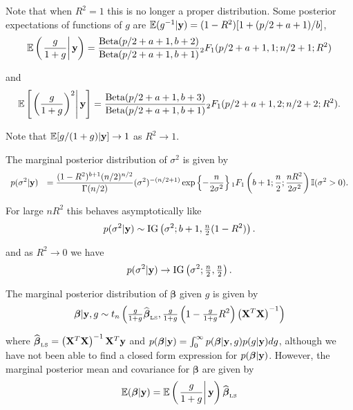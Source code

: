 \documentclass{article}
\def\vectorfontone{\bf}
\def\vectorfonttwo{\boldsymbol}
\def\vy{{\vectorfontone y}}                      %
\def\vbeta{{\vectorfonttwo \beta}}               %
\def\matrixfontone{\bf}
\def\mX{{\matrixfontone X}}                      %
\def\bE{{\mathbb E}}                             %
\def\bI{{\mathbb I}}                             %
\def\ds{\displaystyle}
\theoremstyle{definition}
\begin{document}
\noindent Note that when $R^2=1$ this is no longer a proper distribution. Some posterior expectations
of functions of $g$ are $\bE(g^{-1}|\vy) = (1 -  R^2)[ 1 + (p/2 + a + 1)/b ]$,
\begin{equation}\label{eq:marginalExpectation1}
\bE\left( \left. \frac{g}{1+g}  \right| \vy \right)
=  \frac{ \mbox{Beta}(p/2 + a + 1,b + 2) }{\mbox{Beta}(p/2 + a + 1,b+1)}  {}_2 F_1(p/2 + a + 1,1;n/2 + 1;R^2)
\end{equation}

\noindent and 
\begin{equation}\label{eq:marginalExpectation2}
\bE\left[ \left. \left(\frac{g}{1+g}\right)^2  \right| \vy \right]
=
\frac{\mbox{Beta}(p/2 + a+ 1,b + 3) 
}{\mbox{Beta}(p/2 + a + 1,b+1)} 
{}_2 F_1(p/2 + a + 1,2;n/2 + 2; R^2).
\end{equation}
 
\noindent \noindent Note that $\bE[ g/(1+g)  | \vy] \to 1$ as $R^2 \to 1$.

\medskip 
\noindent The marginal posterior distribution of $\sigma^2$ is given by
\begin{equation}\label{eq:marginalOfSigma2}
\begin{array}{rl}
\ds p(\sigma^2|\vy) 
& \ds = \frac{(1 -  R^2)^{b+1} ( n/2)^{n/2}}{\Gamma(n/2)}
(\sigma^2)^{-(n/2 + 1)}\exp\left\{ -  \frac{n}{2\sigma^2} \right\}  {}_1 F_1\left(
b+1; \frac{n}{2}; \frac{nR^2}{2\sigma^2} \right)  \bI(\sigma^2>0).
\end{array}
\end{equation}

\noindent For large $nR^2$ this behaves asymptotically like
\begin{equation}\label{eq:marginalOfSigma2asympotic}
\ds p(\sigma^2|\vy) 
\sim  \mbox{IG}\left( \sigma^2 ; b+1, \tfrac{n}{2}(1 - R^2) \right).
\end{equation}

\noindent and as $R^2 \to 0$ we have
\begin{equation}\label{eq:marginalOfSigma2asRtoZero}
\ds p(\sigma^2|\vy) 
\to  \mbox{IG}\left( \sigma^2 ; \tfrac{n}{2},  \tfrac{n}{2} \right).
\end{equation}

\medskip 
\noindent The marginal posterior distribution of $\vbeta$ given $g$ is given by
$$
\vbeta|\vy,g \sim t_n\left( \tfrac{g}{1+g}\widehat{\vbeta}_{\mbox{\tiny LS}},  \tfrac{g}{1+g} \left( 
1 -
\tfrac{g}{1+g} R^2\right)  \left( \mX^T\mX \right)^{-1} \right)
$$

\noindent where $\widehat{\vbeta}_{\mbox{\tiny LS}} = \left( \mX^T\mX \right)^{-1}\mX^T\vy$
and
$p(\vbeta|\vy) = \int_{0}^\infty p(\vbeta|\vy,g)p(g|\vy) dg$, although we have not been able to 
find a closed form expression for $p(\vbeta|\vy)$. However, the marginal posterior mean and covariance 
for $\vbeta$ are given by
$$
\ds \bE(\vbeta|\vy) 
= \bE\left( \left. \frac{g}{1+g}  \right| \vy \right) \widehat{\vbeta}_{\mbox{\tiny LS}}
$$
\end{document}
